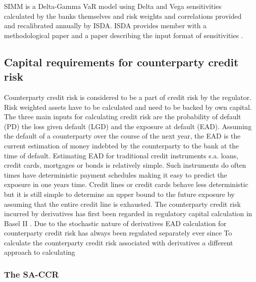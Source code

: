 \documentclass[12pt,a4paper]{article}
\begin{document}
SIMM is a Delta-Gamma VaR model using Delta and Vega sensitivities calculated by the banks themselves and risk weights and correlations provided and recalibrated annually by ISDA. ISDA provides member with a methodological paper \citep{SIMM} and a paper describing the input format of sensitivities \citep{RiskDataStandard}.

\subsection{Capital requirements for counterparty credit risk}
Counterparty credit risk is considered to be a part of credit risk by the regulator. Risk weighted assets have to be calculated and need to be backed by own capital. The three main inputs for calculating credit risk are the probability of default (PD) the loss given default (LGD) and the exposure at default (EAD). Assuming the default of a counterparty over the course of the next year, the EAD is the current estimation of money indebted by the counterparty to the bank at the time of default. Estimating EAD for traditional credit instruments s.a. loans, credit cards, mortgages or bonds is relatively simple. Such instruments do often times have deterministic payment schedules making it easy to predict the exposure in one years time. Credit lines or credit cards behave less deterministic but it is still simple to determine an upper bound to the future exposure by assuming that the entire credit line is exhausted.
The counterparty credit risk incurred by derivatives has first been regarded in regulatory capital calculation in Basel II \citep{basel2}.
Due to the stochastic nature of derivatives EAD calculation for counterparty credit risk has always been regulated separately ever since 
To calculate the counterparty credit risk associated with derivatives a different approach to calculating 

\subsubsection{The SA-CCR}
\end{document}

